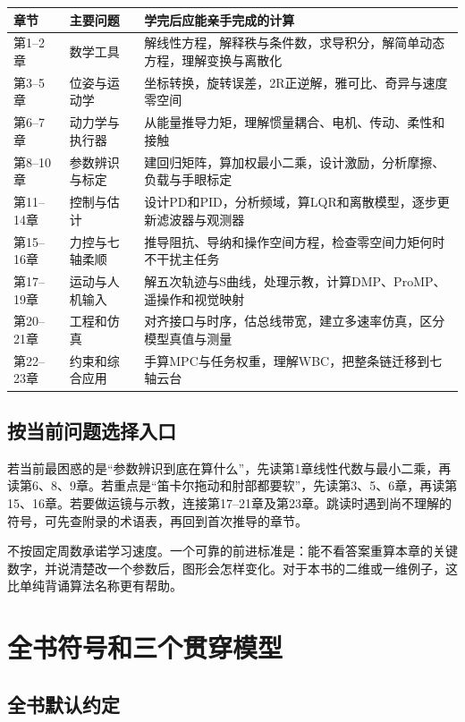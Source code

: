 \begin{longtable}{p{24mm}p{44mm}p{86mm}}
\toprule 章节 & 主要问题 & 学完后应能亲手完成的计算\\\midrule
\endhead
第1--2章 & 数学工具 & 解线性方程，解释秩与条件数，求导积分，解简单动态方程，理解变换与离散化\\
第3--5章 & 位姿与运动学 & 坐标转换，旋转误差，2R正逆解，雅可比、奇异与速度零空间\\
第6--7章 & 动力学与执行器 & 从能量推导力矩，理解惯量耦合、电机、传动、柔性和接触\\
第8--10章 & 参数辨识与标定 & 建回归矩阵，算加权最小二乘，设计激励，分析摩擦、负载与手眼标定\\
第11--14章 & 控制与估计 & 设计PD和PID，分析频域，算LQR和离散模型，逐步更新滤波器与观测器\\
第15--16章 & 力控与七轴柔顺 & 推导阻抗、导纳和操作空间方程，检查零空间力矩何时不干扰主任务\\
第17--19章 & 运动与人机输入 & 解五次轨迹与S曲线，处理示教，计算DMP、ProMP、遥操作和视觉映射\\
第20--21章 & 工程和仿真 & 对齐接口与时序，估总线带宽，建立多速率仿真，区分模型真值与测量\\
第22--23章 & 约束和综合应用 & 手算MPC与任务权重，理解WBC，把整条链迁移到七轴云台\\
\bottomrule
\end{longtable}

\section*{按当前问题选择入口}

若当前最困惑的是“参数辨识到底在算什么”，先读第1章线性代数与最小二乘，再读第6、8、9章。若重点是“笛卡尔拖动和肘部都要软”，先读第3、5、6章，再读第15、16章。若要做运镜与示教，连接第17--21章及第23章。跳读时遇到尚不理解的符号，可先查附录的术语表，再回到首次推导的章节。

不按固定周数承诺学习速度。一个可靠的前进标准是：能不看答案重算本章的关键数字，并说清楚改一个参数后，图形会怎样变化。对于本书的二维或一维例子，这比单纯背诵算法名称更有帮助。

\chapter*{全书符号和三个贯穿模型}

\section*{全书默认约定}

